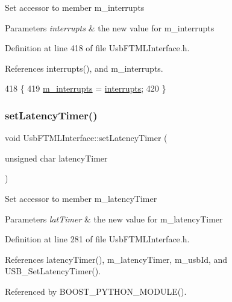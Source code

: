 Set accessor to member m\+\_\+interrupts 
\begin{DoxyParams}{Parameters}
{\em interrupts} & the new value for m\+\_\+interrupts \\
\hline
\end{DoxyParams}


Definition at line 418 of file Usb\+F\+T\+M\+L\+Interface.\+h.



References interrupts(), and m\+\_\+interrupts.


\begin{DoxyCode}
418                                        \{
419     \hyperlink{classUsbFTMLInterface_adb6a6a61e78d9b489e6ecefd5752d5ad}{m\_interrupts} = \hyperlink{classUsbFTMLInterface_afab1c2175bd2bca261ffa2b8ee67df2d}{interrupts};
420   \}
\end{DoxyCode}
\mbox{\label{classUsbFTMLInterface_a3625ccc604bbf5e707b3f5d91bc8f1bb}} 
\subsubsection{\texorpdfstring{set\+Latency\+Timer()}{setLatencyTimer()}}
{\footnotesize\ttfamily void Usb\+F\+T\+M\+L\+Interface\+::set\+Latency\+Timer (\begin{DoxyParamCaption}\item[{unsigned char}]{latency\+Timer }\end{DoxyParamCaption})\hspace{0.3cm}{\ttfamily [inline]}}

Set accessor to member m\+\_\+latency\+Timer 
\begin{DoxyParams}{Parameters}
{\em lat\+Timer} & the new value for m\+\_\+latency\+Timer \\
\hline
\end{DoxyParams}


Definition at line 281 of file Usb\+F\+T\+M\+L\+Interface.\+h.



References latency\+Timer(), m\+\_\+latency\+Timer, m\+\_\+usb\+Id, and U\+S\+B\+\_\+\+Set\+Latency\+Timer().



Referenced by B\+O\+O\+S\+T\+\_\+\+P\+Y\+T\+H\+O\+N\+\_\+\+M\+O\+D\+U\+L\+E().


